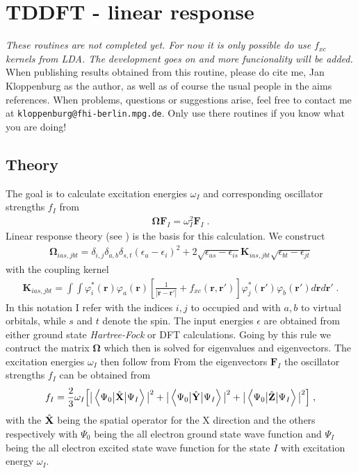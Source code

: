 \section{TDDFT - linear response}\label{Sec:TDDFT}

\emph{These routines are not completed yet. For now it is only possible do use $f_{xc}$ kernels from LDA.
The development goes on and more funcionality will be added.}
When publishing results obtained from this routine, please do cite me, Jan Kloppenburg as the author, as well as of course the
usual people in the aims references. When problems, questions or suggestions arise, feel free to contact me at {\tt kloppenburg@fhi-berlin.mpg.de}.
Only use there routines if you know what you are doing!

\subsection*{Theory}
The goal is to calculate excitation energies $\omega_I$ and corresponding oscillator strengths $f_I$ from
\begin{align}
{\mathbf\Omega}\mathbf{F}_I=\omega^2_I\mathbf{F}_I\;.
\end{align}
Linear response theory (see \cite{casida96}) is the basis for this calculation. We construct
\begin{align}
{\mathbf\Omega}_{ias,jbt} = \delta_{i,j}\delta_{a,b}\delta_{s,t}(\epsilon_a-\epsilon_i)^2 + 2\sqrt{\epsilon_{as}-\epsilon_{is}}\mathbf{K}_{ias,jbt}\sqrt{\epsilon_{bt}-\epsilon_{jt}}
\end{align}
with the coupling kernel
\begin{align}\label{casidakernel}
\mathbf{K}_{ias,jbt} = \int\int\varphi^*_{i}(\mathbf{r})\varphi_{a}(\mathbf{r})
\left[\frac{1}{\left|\mathbf{r}-\mathbf{r}'\right|}+f_{xc}(\mathbf{r},\mathbf{r}')\right]
\varphi^*_{j}(\mathbf{r}')\varphi_{b}(\mathbf{r}')d\mathbf{r}d\mathbf{r}'\;.
\end{align}
In this notation I refer with the indices $i,j$ to occupied and with $a,b$ to virtual orbitals, while $s$ and $t$ denote the spin.
The input energies $\epsilon$ are obtained from either ground state {\em Hartree-Fock} or DFT calculations. Going by this rule we contruct the matrix
$\mathbf{\Omega}$ which then is solved for eigenvalues and eigenvectors. The excitation energies $\omega_I$ then follow from
From the eigenvectors $\mathbf{F}_I$ the oscillator strengths $f_I$ can be obtained from
\begin{align}
f_I=\frac{2}{3}\omega_I\Big[\big|\left<\Psi_0\big|\hat{\bf{X}}\big|\Psi_I\right>\big|^2+
\big|\left<\Psi_0\big|\hat{\bf{Y}}\big|\Psi_I\right>\big|^2+\big|\left<\Psi_0\big|\hat{\bf{Z}}\big|\Psi_I\right>\big|^2\Big]\;,
\end{align}
with the $\hat{\bf{X}}$ being the spatial operator for the X direction and the others respectively with $\Psi_0$ being the all electron ground state wave function
and $\Psi_I$ being the all electron excited state wave function for the state $I$ with excitation energy $\omega_I$.

